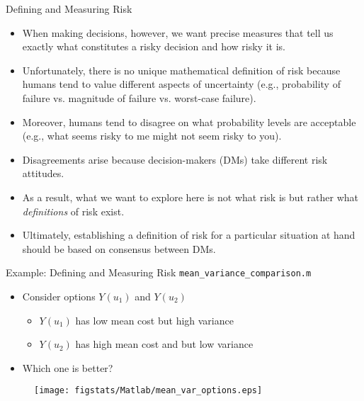 \documentclass[handout,9pt]{beamer}
\begin{document}
%
\begin{frame}{Defining and Measuring Risk}

\begin{itemize}
   \setlength{\itemsep}{10pt}
\item When making decisions, however, we want precise measures that tell us exactly what constitutes a risky decision and how risky it is. 

\item Unfortunately, there is no unique mathematical definition of risk because humans tend to value different aspects of  uncertainty (e.g., probability of failure vs. magnitude of failure vs. worst-case failure).  

\item Moreover, humans tend to disagree on what probability levels are acceptable (e.g., what seems risky to me might not seem risky to you).

\item Disagreements arise because decision-makers (DMs) take different risk attitudes. 

\item As a result, what we want to explore here is not what risk is but rather what {\em definitions} of risk exist. 

\item Ultimately, establishing a definition of risk for a particular situation at hand should be based on consensus between DMs. 

\end{itemize}

\end{frame}

%
\begin{frame}{Example: Defining and Measuring Risk \footnotesize{\texttt{mean\_variance\_comparison.m}}}
\begin{itemize}
   \setlength{\itemsep}{10pt}
\item Consider options $Y(u_1)$ and $Y(u_2)$  
\begin{itemize}
   \setlength{\itemsep}{10pt}
\item $Y(u_1)$ has low mean cost but high variance 
\item $Y(u_2)$ has high mean cost and but low variance
\end{itemize}
\item Which one is better?
\end{itemize}
\begin{figure}[!htb]
    \centering
	\texttt{[image: figstats/Matlab/mean\_var\_options.eps]}
\end{figure}

\end{frame}
\end{document}
